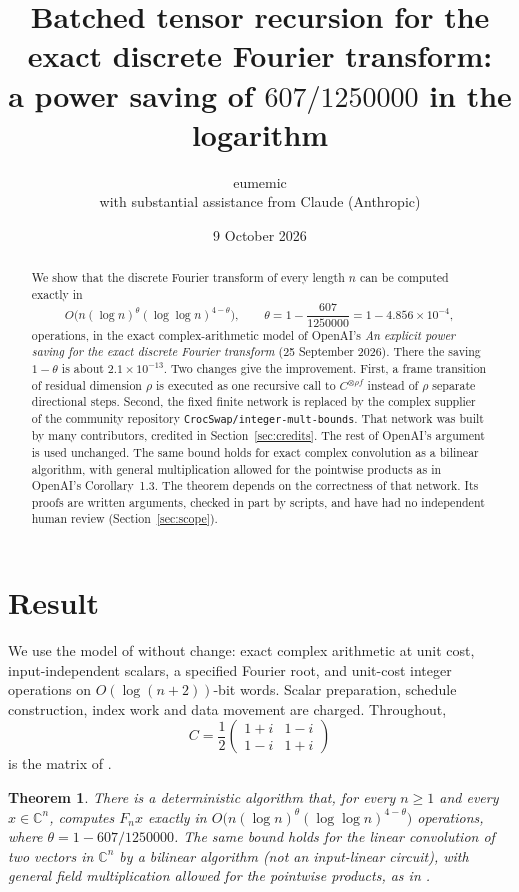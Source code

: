 \documentclass[11pt]{article}
\title{Batched tensor recursion for the exact discrete Fourier transform:\\
\large a power saving of $607/1250000$ in the logarithm}
\author{eumemic\\\small with substantial assistance from Claude (Anthropic)}
\date{9 October 2026}
\newtheorem{theorem}{Theorem}[section]
\theoremstyle{definition}
\begin{document}
\maketitle

\begin{abstract}
We show that the discrete Fourier transform of every length $n$ can be computed
exactly in
\[
 O\bigl(n(\log n)^{\theta}(\log\log n)^{4-\theta}\bigr),\qquad
 \theta=1-\frac{607}{1250000}=1-4.856\times10^{-4},
\]
operations, in the exact complex-arithmetic model of OpenAI's
\emph{An explicit power saving for the exact discrete Fourier transform}
(25 September 2026). There the saving $1-\theta$ is about $2.1\times10^{-13}$.
Two changes give the improvement. First, a frame transition of residual
dimension $\rho$ is executed as one recursive call to $C^{\otimes\rho f}$
instead of $\rho$ separate directional steps. Second, the fixed finite network
is replaced by the complex supplier of the community repository
\texttt{CrocSwap/integer-mult-bounds}. That network was built by many
contributors, credited in Section~\ref{sec:credits}. The rest of OpenAI's
argument is used unchanged. The same bound holds for exact complex convolution
as a bilinear algorithm, with general multiplication allowed for the pointwise
products as in OpenAI's Corollary~1.3. The theorem depends on the correctness of that network. Its
proofs are written arguments, checked in part by scripts, and have had no
independent human review (Section~\ref{sec:scope}).
\end{abstract}

\section{Result}
We use the model of \cite[\S1.1]{oai-dft} without change: exact complex
arithmetic at unit cost, input-independent scalars, a specified Fourier root,
and unit-cost integer operations on $O(\log(n+2))$-bit words. Scalar
preparation, schedule construction, index work and data movement are charged.
Throughout,
\[
 C=\frac12\begin{pmatrix}1+i&1-i\\1-i&1+i\end{pmatrix}
\]
is the matrix of \cite[(2.1)]{oai-dft}.

\begin{theorem}\label{thm:main}
There is a deterministic algorithm that, for every $n\ge1$ and every
$x\in\mathbb C^n$, computes $F_nx$ exactly in
$O\bigl(n(\log n)^{\theta}(\log\log n)^{4-\theta}\bigr)$ operations,
where $\theta=1-607/1250000$. The same bound holds for the linear convolution
of two vectors in $\mathbb C^n$ by a bilinear algorithm (not an input-linear
circuit), with general field multiplication allowed for the pointwise products,
as in \cite[Corollary~1.3]{oai-dft}.
\end{theorem}
\end{document}
